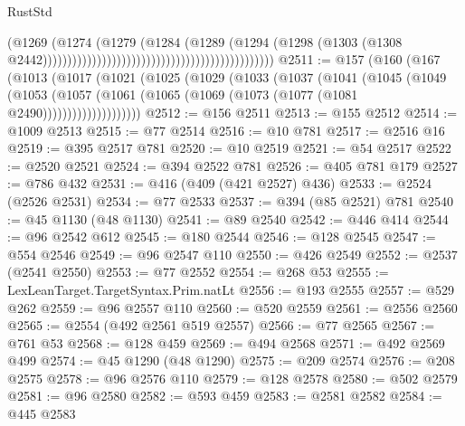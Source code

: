\begin{lexlean}{RustStd}
\begin{coremodule}
{\begin{coremodule}
{{{{{{{{{{{{{{{{{{{{{{{{{{{{{{{{{{{{{{{{{{{{{{{{{{{{{{{{{{{{                                                                                (@1269
                                                                                  (@1274
                                                                                    (@1279
                                                                                      (@1284
                                                                                        (@1289
                                                                                          (@1294
                                                                                            (@1298
                                                                                              (@1303
                                                                                                (@1308
                                                                                                  @2442)))))))))))))))))))))))))))))))))))))))))))))))
@2511 := @157
    (@160
      (@167
        (@1013
          (@1017
            (@1021
              (@1025
                (@1029
                  (@1033
                    (@1037
                      (@1041
                        (@1045
                          (@1049
                            (@1053
                              (@1057
                                (@1061 (@1065 (@1069 (@1073 (@1077 (@1081 @2490))))))))))))))))))))
@2512 := @156 @2511
@2513 := @155 @2512
@2514 := @1009 @2513
@2515 := @77 @2514
@2516 := @10 @781
@2517 := @2516 @16
@2519 := @395 @2517 @781
@2520 := @10 @2519
@2521 := @54 @2517
@2522 := @2520 @2521
@2524 := @394 @2522 @781
@2526 := @405 @781 @179
@2527 := @786 @432
@2531 := @416 (@409 (@421 @2527) @436)
@2533 := @2524 (@2526 @2531)
@2534 := @77 @2533
@2537 := @394 (@85 @2521) @781
@2540 := @45 @1130 (@48 @1130)
@2541 := @89 @2540
@2542 := @446 @414
@2544 := @96 @2542 @612
@2545 := @180 @2544
@2546 := @128 @2545
@2547 := @554 @2546
@2549 := @96 @2547 @110
@2550 := @426 @2549
@2552 := @2537 (@2541 @2550)
@2553 := @77 @2552
@2554 := @268 @53
@2555 := LexLeanTarget.TargetSyntax.Prim.natLt
@2556 := @193 @2555
@2557 := @529 @262
@2559 := @96 @2557 @110
@2560 := @520 @2559
@2561 := @2556 @2560
@2565 := @2554 (@492 @2561 @519 @2557)
@2566 := @77 @2565
@2567 := @761 @53
@2568 := @128 @459
@2569 := @494 @2568
@2571 := @492 @2569 @499
@2574 := @45 @1290 (@48 @1290)
@2575 := @209 @2574
@2576 := @208 @2575
@2578 := @96 @2576 @110
@2579 := @128 @2578
@2580 := @502 @2579
@2581 := @96 @2580
@2582 := @593 @459
@2583 := @2581 @2582
@2584 := @445 @2583
}}}}}}}}}}}}}}}}}}}}}}}}}}}}}}}}}}}}}}}}}}}}}}}}}}}}}}}}}}}}
\end{coremodule}}
\end{coremodule}
\end{lexlean}
